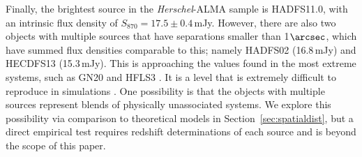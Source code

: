 \documentclass[iop]{emulateapj}
\begin{document}

Finally, the brightest source in the {\it Herschel}-ALMA sample is HADFS11.0,
with an intrinsic flux density of $S_{870} = 17.5 \pm 0.4\,$mJy.  However,
there are also two objects with multiple sources that have separations smaller
than 1$\arcsec$, which have summed flux densities comparable to this; namely
HADFS02 (16.8$\,$mJy) and HECDFS13 (15.3$\,$mJy).  This is approaching the
values found in the most extreme systems, such as GN20
\citep[20.6$\,$mJy,][]{2006MNRAS.370.1185P} and HFLS3
\citep[15-20$\,$mJy;][]{Riechers:2013lr, Cooray:2014rm, Robson:2014xy}.  It is
a level that is extremely difficult to reproduce in simulations
\citep[e.g.,][]{Narayanan:2010lr}.  One possibility is that the objects with
multiple sources represent blends of physically unassociated systems.  We
explore this possibility via comparison to theoretical models in
Section~\ref{sec:spatialdist}, but a direct empirical test requires redshift
determinations of each source and is beyond the scope of this paper.
\end{document}
